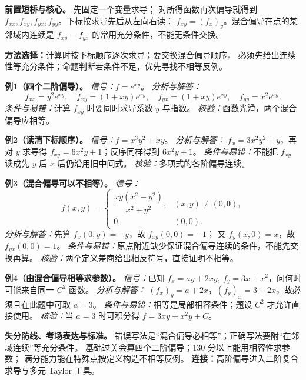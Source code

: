 
\begin{knowledgeBox}
\textbf{前置短桥与核心。}
先固定一个变量求导；
对所得函数再次偏导就得到
\(f_{xx},f_{xy},f_{yx},f_{yy}\)。下标按求导先后从左向右读：
\(f_{xy}=(f_x)_y\)。混合偏导在点的某邻域内连续是
\(f_{xy}=f_{yx}\) 的常用充分条件，不能无条件交换。

\textbf{方法选择：}计算时按下标顺序逐次求导；要交换混合偏导顺序，
必须先给出连续性等充分条件；命题判断若条件不足，优先寻找不相等反例。

\textbf{例1（四个二阶偏导）。}
\emph{信号：}\(f=e^{xy}\)。
\emph{分析与解答：}
\[
f_{xx}=y^2e^{xy},\quad
f_{xy}=(1+xy)e^{xy},\quad
f_{yx}=(1+xy)e^{xy},\quad
f_{yy}=x^2e^{xy}.
\]
\emph{条件与易错：}计算 \(f_{xy}\) 时要同时求导系数 \(y\) 与指数。
\emph{核验：}函数光滑，两个混合偏导应相等。

\textbf{例2（读清下标顺序）。}
\emph{信号：}\(f=x^3y^2+xy\)。
\emph{分析与解答：}
\(f_x=3x^2y^2+y\)，再对 \(y\) 求导得
\(f_{xy}=6x^2y+1\)；反序同样得到 \(6x^2y+1\)。
\emph{条件与易错：}不能把 \(f_{xy}\) 读成先 \(y\) 后 \(x\) 后仍沿用旧中间式。
\emph{核验：}多项式的各阶偏导连续。

\textbf{例3（混合偏导可以不相等）。}
\emph{信号：}
\[
f(x,y)=
\begin{cases}
\dfrac{xy(x^2-y^2)}{x^2+y^2},&(x,y)\ne(0,0),\\0,&(0,0).
\end{cases}
\]
\emph{分析与解答：}先算
\(f_x(0,y)=-y\)，故 \(f_{xy}(0,0)=-1\)；
又 \(f_y(x,0)=x\)，故 \(f_{yx}(0,0)=1\)。
\emph{条件与易错：}原点附近缺少保证混合偏导连续的条件，不能先交换再算。
\emph{核验：}两个定义差商给出相反符号，直接证明不相等。

\textbf{例4（由混合偏导相等求参数）。}
\emph{信号：}已知
\(f_x=ay+2xy,\ f_y=3x+x^2\)，问何时可能来自同一 \(C^2\) 函数。
\emph{分析与解答：}
\((f_x)_y=a+2x\)，\((f_y)_x=3+2x\)，故必须且在此题中可取
\(a=3\)。
\emph{条件与易错：}相等是局部相容条件；题设 \(C^2\) 才允许直接使用。
\emph{核验：}当 \(a=3\) 时可积分得 \(f=3xy+x^2y+C\)。

\textbf{失分防线、考场表达与标准。}
错误写法是“混合偏导必相等”；正确写法要附“在邻域连续”等充分条件。
基础过关会算四个二阶偏导；130 分以上能用相容性求参数；
满分能力能在特殊点按定义构造不相等反例。
\textbf{连接：}高阶偏导进入二阶复合求导与多元 Taylor 工具。
\end{knowledgeBox}


